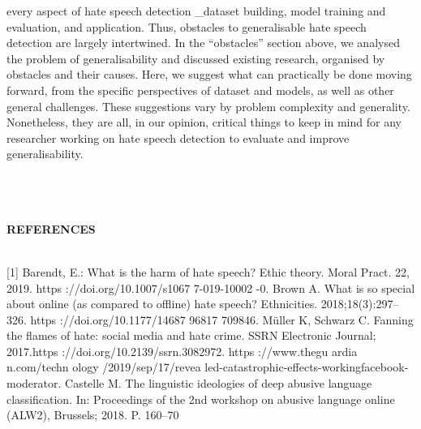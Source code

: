 \documentclass{letter}
\begin{document}
\begin{multicols}{2}
every aspect of hate speech detection \_dataset building, 
model training and evaluation, and application. Thus, 
obstacles to generalisable hate speech detection are 
largely intertwined. In the ``obstacles'' section above, we 
analysed the problem of generalisability and discussed 
existing research, organised by obstacles and their 
causes. Here, we suggest what can practically be done 
moving forward, from the specific perspectives of 
dataset and models, as well as other general challenges. 
These suggestions vary by problem complexity and 
generality. Nonetheless, they are all, in our opinion, 
critical things to keep in mind for any researcher 
working on hate speech detection to evaluate and 
improve generalisability.\\ \\ \\ \\  
\begin{small}{\textbf{REFERENCES}}\\ \\
\end{small}
\begin{scriptsize}{[1] Barendt, E.: What is the harm of hate speech? Ethic theory. Moral 
Pract. 22, 2019. https ://doi.org/10.1007/s1067 7-019-10002 -0. \newline \newline
[2] Brown A. What is so special about online (as compared to offline) 
hate speech? Ethnicities. 2018;18(3):297–326. https 
://doi.org/10.1177/14687 96817 709846. \newline \newline
[3] Müller K, Schwarz C. Fanning the flames of hate: social media 
and hate crime. SSRN Electronic Journal; 2017.https 
://doi.org/10.2139/ssrn.3082972. \newline \newline
[4] https ://www.thegu ardia n.com/techn ology /2019/sep/17/revea 
led-catastrophic-effects-workingfacebook-moderator. \newline \newline
[5] Castelle M. The linguistic ideologies of deep abusive language 
classification. In: Proceedings of the 2nd workshop on abusive 
language online (ALW2), Brussels; 2018. P. 160–70}


\newpage


\end{scriptsize}
\end{multicols}
\end{document}
